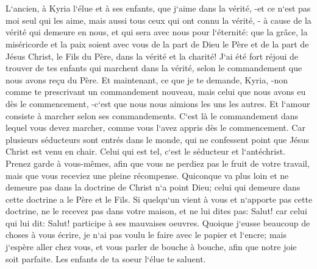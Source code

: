 

\chapter{}

\verse L`ancien, à Kyria l`élue et à ses enfants, que j`aime dans la vérité, -et ce n`est pas moi seul qui les aime, mais aussi tous ceux qui ont connu la vérité, - 
\verse à cause de la vérité qui demeure en nous, et qui sera avec nous pour l`éternité: 
\verse que la grâce, la miséricorde et la paix soient avec vous de la part de Dieu le Père et de la part de Jésus Christ, le Fils du Père, dans la vérité et la charité! 
\verse J`ai été fort réjoui de trouver de tes enfants qui marchent dans la vérité, selon le commandement que nous avons reçu du Père. 
\verse Et maintenant, ce que je te demande, Kyria, -non comme te prescrivant un commandement nouveau, mais celui que nous avons eu dès le commencement, -c`est que nous nous aimions les uns les autres. 
\verse Et l`amour consiste à marcher selon ses commandements. C`est là le commandement dans lequel vous devez marcher, comme vous l`avez appris dès le commencement. 
\verse Car plusieurs séducteurs sont entrés dans le monde, qui ne confessent point que Jésus Christ est venu en chair. Celui qui est tel, c`est le séducteur et l`antéchrist. 
\verse Prenez garde à vous-mêmes, afin que vous ne perdiez pas le fruit de votre travail, mais que vous receviez une pleine récompense. 
\verse Quiconque va plus loin et ne demeure pas dans la doctrine de Christ n`a point Dieu; celui qui demeure dans cette doctrine a le Père et le Fils. 
\verse Si quelqu`un vient à vous et n`apporte pas cette doctrine, ne le recevez pas dans votre maison, et ne lui dites pas: Salut! 
\verse car celui qui lui dit: Salut! participe à ses mauvaises oeuvres. 
\verse Quoique j`eusse beaucoup de choses à vous écrire, je n`ai pas voulu le faire avec le papier et l`encre; mais j`espère aller chez vous, et vous parler de bouche à bouche, afin que notre joie soit parfaite. 
\verse Les enfants de ta soeur l`élue te saluent. 

